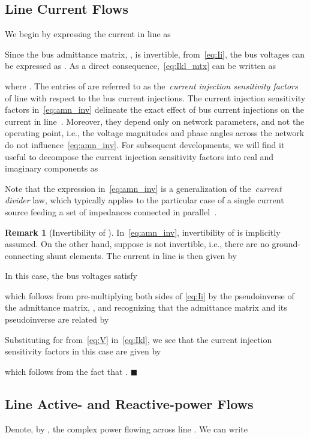 \documentclass[journal]{IEEEtran}
\theoremstyle{definition}
\newtheorem{remark}{Remark}
\newcommand{\qedblack}{\hfill \ensuremath{\blacksquare}}
\begin{document}
\subsection{Line Current Flows}
We begin by expressing the current in line  as

Since the bus admittance matrix, , is invertible, from~\eqref{eq:Ii}, the bus voltages can be expressed as . As a direct consequence,~\eqref{eq:Ikl_mtx} can be written as 

where . The entries of  are referred to as the~\emph{current injection sensitivity factors} of line  with respect to the bus current injections. The current injection sensitivity factors in~\eqref{eq:amn_inv} delineate the exact effect of bus current injections on the current in line~.  Moreover, they depend only on network parameters, and not the operating point, i.e., the voltage magnitudes and phase angles across the network do not influence~\eqref{eq:amn_inv}. For subsequent developments, we will find it useful to decompose the current injection sensitivity factors into real and imaginary components as 
 
Note that the expression in~\eqref{eq:amn_inv} is a generalization of the~\emph{current divider} law, which typically applies to the particular case of a single current source feeding a set of impedances connected in parallel~\cite{Sedra-2007}.

\begin{remark}[Invertibility of ]
\label{rem:Yinv}
In~\eqref{eq:amn_inv}, invertibility of  is implicitly assumed.   On the other hand, suppose  is not invertible, i.e., there are no ground-connecting shunt elements. The current in line  is then given by

In this case, the bus voltages satisfy
 
which follows from pre-multiplying both sides of \eqref{eq:Ii} by the pseudoinverse of the admittance matrix, , and recognizing that the admittance matrix and its pseudoinverse are related by~\cite{Horn:2013}

Substituting for  from~\eqref{eq:V} in~\eqref{eq:Ikl}, we see that the current injection sensitivity factors in this case are given by

which follows from the fact that . \qedblack
\end{remark}

\subsection{Line Active- and Reactive-power Flows}
\label{sec:powerdiv}
Denote, by , the complex power flowing across line .  We can write
\end{document}
